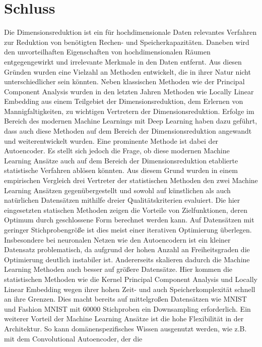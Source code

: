 \chapter{Schluss}
\label{ch:Schluss}

Die Dimensionsreduktion ist ein für hochdimensionale Daten relevantes Verfahren zur Reduktion von
benötigten Rechen- und Speicherkapazitäten. Daneben wird den unvorteilhaften Eigenschaften von
hochdimensionalen Räumen entgegengewirkt und irrelevante Merkmale in den Daten entfernt. Aus diesen
Gründen wurden eine Vielzahl an Methoden entwickelt, die in ihrer Natur nicht unterschiedlicher
sein könnten. Neben klassischen Methoden wie der Principal Component Analysis wurden in den letzten
Jahren Methoden wie Locally Linear Embedding aus einem Teilgebiet der Dimensionsreduktion, dem
Erlernen von Mannigfaltigkeiten, zu wichtigen Vertretern der Dimensionsreduktion. Erfolge im
Bereich des modernen Machine Learnings mit Deep Learning haben dazu geführt, dass auch diese
Methoden auf dem Bereich der Dimensionsreduktion angewandt und weiterentwickelt wurden. Eine
prominente Methode ist dabei der Autoencoder. Es stellt sich jedoch die Frage, ob diese modernen
Machine Learning Ansätze auch auf dem Bereich der Dimensionsreduktion etablierte statistische
Verfahren ablösen könnten. Aus diesem Grund wurden in einem empirischen Vergleich drei Vertreter
der statistischen Methoden den zwei Machine Learning Ansätzen gegenübergestellt und sowohl auf
künstlichen als auch natürlichen Datensätzen mithilfe dreier Qualitätskriterien evaluiert. Die hier
eingesetzten statischen Methoden zeigen die Vorteile von Zielfunktionen, deren Optimum durch
geschlossene Form berechnet werden kann. Auf Datensätzen mit geringer Stichprobengröße ist dies
meist einer iterativen Optimierung überlegen. Insbesondere bei neuronalen Netzen wie den
Autoencodern ist ein kleiner Datensatz problematisch, da aufgrund der hohen Anzahl an
Freiheitsgraden die Optimierung deutlich instabiler ist. Andererseits skalieren dadurch die Machine
Learning Methoden auch besser auf größere Datensätze. Hier kommen die statistischen Methoden wie
die Kernel Principal Component Analysis und Locally Linear Embedding wegen ihrer hohen Zeit- und
auch Speicherkomplexität schnell an ihre Grenzen. Dies macht bereits auf mittelgroßen Datensätzen
wie MNIST und Fashion MNIST mit \num{60000} Stichproben ein Downsampling erforderlich. Ein weiterer
Vorteil der Machine Learning Ansätze ist die hohe Flexibilität in der Architektur. So kann
domänenspezifisches Wissen ausgenutzt werden, wie z.B. mit dem Convolutional Autoencoder, der die
